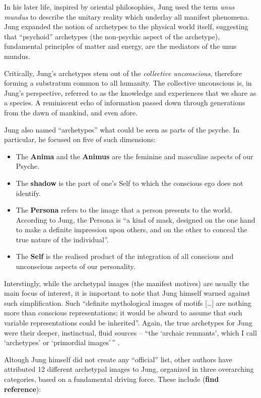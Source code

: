\documentclass[]{book}
\providecommand{\tightlist}{%
  \setlength{\itemsep}{0pt}\setlength{\parskip}{0pt}}
\begin{document}
In his later life, inspired by oriental philosophies, Jung used the term \emph{unus mundus} to describe the unitary reality which underlay all manifest phenomena. Jung expanded the notion of archetypes to the physical world itself, suggesting that ``psychoid'' archetypes (the non-psychic aspect of the archetype), fundamental principles of matter and energy, are the mediators of the unus mundus.

Critically, Jung's archetypes stem out of the \emph{collective unconscious}, therefore forming a substratum common to all humanity. The collective unconscious is, in Jung's perspective, referred to as the knowledge and experiences that we share as a species. A reminiscent echo of information passed down through generations from the dawn of mankind, and even afore.

Jung also named ``archetypes'' what could be seen as parts of the psyche. In particular, he focused on five of such dimensions:

\begin{itemize}
\tightlist
\item
  The \textbf{Anima} and the \textbf{Animus} are the feminine and masculine aspects of our Psyche.
\item
  The \textbf{shadow} is the part of one's Self to which the conscious ego does not identify.
\item
  The \textbf{Persona} refers to the image that a person presents to the world. According to Jung, the Persona is ``a kind of mask, designed on the one hand to make a definite impression upon others, and on the other to conceal the true nature of the individual''.
\item
  The \textbf{Self} is the realised product of the integration of all conscious and unconscious aspects of our personality.
\end{itemize}

Interstingly, while the archetypal images (the manifest motives) are usually the main focus of interest, it is important to note that Jung himself warned against such simplification. Such ``definite mythological images of motifs {[}\ldots{]} are nothing more than conscious representations; it would be absurd to assume that such variable representations could be inherited''. Again, the true archetypes for Jung were their deeper, instinctual, fluid sources -- ``the `archaic remnants', which I call `archetypes' or `primordial images'\,'' \citep{jung1964approaching}.

Altough Jung himself did not create any ``official'' list, other authors have attributed 12 different archetypal images to Jung, organized in three overarching categories, based on a fundamental driving force. These include (\textbf{find reference}):
\end{document}
